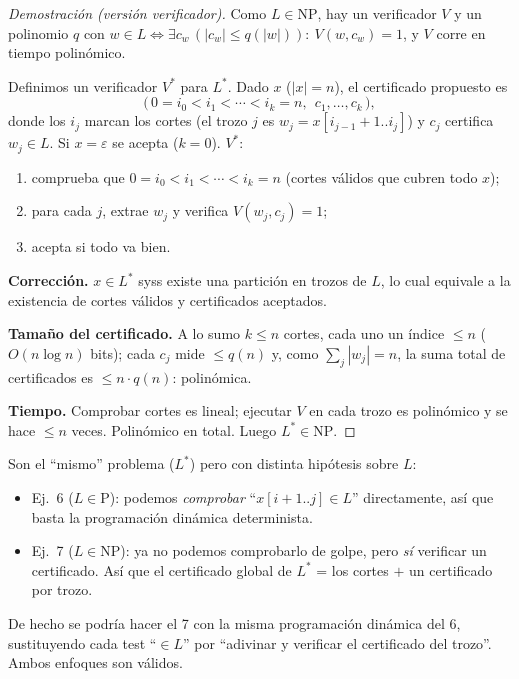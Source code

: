 \documentclass[11pt,a4paper]{article}
\theoremstyle{plain}
\theoremstyle{definition}
\newcommand{\NP}{\mathrm{NP}}
\newcommand{\Pclass}{\mathrm{P}}
\newcommand{\Lstar}{L^{*}}
\begin{document}
\begin{proof}[Demostraci\'on (versi\'on verificador)]
Como $L\in\NP$, hay un verificador $V$ y un polinomio $q$ con
$w\in L\iff \exists c_w\,(|c_w|\le q(|w|)):\ V(w,c_w)=1$, y $V$ corre en tiempo
polin\'omico.

Definimos un verificador $V^{*}$ para $\Lstar$. Dado $x$ ($|x|=n$), el certificado
propuesto es
\[
\big(\, 0=i_0 < i_1 < \cdots < i_k = n,\ \ c_1,\dots,c_k \,\big),
\]
donde los $i_j$ marcan los cortes (el trozo $j$ es $w_j=x[i_{j-1}+1..i_j]$) y $c_j$
certifica $w_j\in L$. Si $x=\varepsilon$ se acepta ($k=0$). $V^{*}$:
\begin{enumerate}[nosep]
  \item comprueba que $0=i_0<i_1<\cdots<i_k=n$ (cortes v\'alidos que cubren todo $x$);
  \item para cada $j$, extrae $w_j$ y verifica $V(w_j,c_j)=1$;
  \item acepta si todo va bien.
\end{enumerate}

\textbf{Correcci\'on.} $x\in\Lstar$ syss existe una partici\'on en trozos de $L$, lo
cual equivale a la existencia de cortes v\'alidos y certificados aceptados.

\textbf{Tama\~no del certificado.} A lo sumo $k\le n$ cortes, cada uno un \'indice
$\le n$ ($O(n\log n)$ bits); cada $c_j$ mide $\le q(n)$ y, como $\sum_j|w_j|=n$, la
suma total de certificados es $\le n\cdot q(n)$: polin\'omica.

\textbf{Tiempo.} Comprobar cortes es lineal; ejecutar $V$ en cada trozo es
polin\'omico y se hace $\le n$ veces. Polin\'omico en total. Luego $\Lstar\in\NP$.
\end{proof}

\begin{concepto}
Son el ``mismo'' problema ($\Lstar$) pero con distinta hip\'otesis sobre $L$:
\begin{itemize}[nosep]
  \item Ej.\ 6 ($L\in\Pclass$): podemos \emph{comprobar} ``$x[i+1..j]\in L$''
        directamente, as\'i que basta la programaci\'on din\'amica determinista.
  \item Ej.\ 7 ($L\in\NP$): ya no podemos comprobarlo de golpe, pero \emph{s\'i}
        verificar un certificado. As\'i que el certificado global de $\Lstar$ = los
        cortes $+$ un certificado por trozo.
\end{itemize}
De hecho se podr\'ia hacer el 7 con la misma programaci\'on din\'amica del 6,
sustituyendo cada test ``$\in L$'' por ``adivinar y verificar el certificado del
trozo''. Ambos enfoques son v\'alidos.
\end{concepto}
\end{document}
